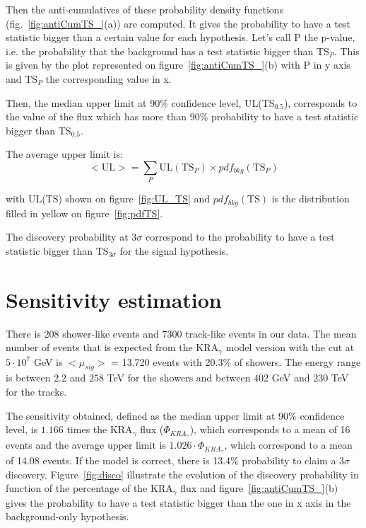 \documentclass[final,twoside,onecolumn,10pt]{article}
\begin{document}
	Then the anti-cumulatives of these probability density functions (fig.~\ref{fig:antiCumTS_}(a)) are computed. It gives the probability to have a test statistic bigger than a certain value for each hypothesis. Let's call P the p-value, i.e. the probability that the background has a test statistic bigger than TS$_{P}$. This is given by the plot represented on figure~\ref{fig:antiCumTS_}(b) with P in y axis and TS$_{P}$ the corresponding value in x.

	Then, the median upper limit at 90\% confidence level, UL(TS$_{0.5}$), corresponds to the value of the flux which has more than 90\% probability to have a test statistic bigger than TS$_{0.5}$.

	The average upper limit is:
	\begin{equation}
		<\text{UL}> = \sum\limits_{P} \text{UL}(\text{TS}_P) \times pdf_{bkg}(\text{TS}_P)
	\end{equation}

	with UL($\text{TS}$) shown on figure~\ref{fig:UL_TS} and $pdf_{bkg}(\text{TS})$ is the distribution filled in yellow on figure~\ref{fig:pdfTS}.

	The discovery probability at 3$\sigma$ correspond to the probability to have a test statistic bigger than TS$_{3\sigma}$ for the signal hypothesis.



\section{Sensitivity estimation}
	There is 208 shower-like events and 7300 track-like events in our data. The mean number of events that is expected from the KRA$_γ$ model version with the cut at $5\cdot10^7$ GeV is $<\mu_{sig}>$ = 13.720 events with 20.3\% of showers. The energy range is between $2.2$ and $258$ TeV for the showers and between $402$ GeV and $230$ TeV for the tracks.
	
	The sensitivity obtained, defined as the median upper limit at 90$\%$ confidence level, is $1.166$ times the KRA$_γ$ flux ($\Phi_{KRA_γ}$), which corresponds to a mean of 16 events and the average upper limit is $1.026 \cdot \Phi_{KRA_γ}$, which correspond to a mean of 14.08 events. If the model is correct, there is 13.4$\%$ probability to claim a 3$\sigma$ discovery. Figure~\ref{fig:disco} illustrate the evolution of the discovery probability in function of the percentage of the KRA$_γ$ flux and figure~\ref{fig:antiCumTS_}(b) gives the probability to have a test statistic bigger than the one in x axis in the background-only hypothesis.
	
\end{document}
